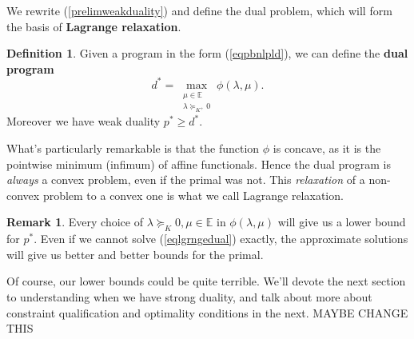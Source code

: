 \documentclass[11pt]{article}
\numberwithin{equation}{section}
\theoremstyle{definition}
\newtheorem{definition}[theorem]{Definition}%
\newtheorem{remark}[theorem]{Remark}
\newcommand{\bE}{\mathbb{E}}
\begin{document}
We rewrite (\ref{prelimweakduality}) and define the dual problem, which will form the basis of \textbf{Lagrange relaxation}.
\begin{definition}
    Given a program in the form (\ref{eqpbnlpld}), we can define the \textbf{dual program}
    \begin{equation}
        \label{eqlgrngedual}
        d^*=\max_{\substack{\mu\in\bE\\\lambda\succeq_{K^+} 0 }}\phi(\lambda,\mu).
    \end{equation}
    Moreover we have weak duality $p^*\ge d^*$.
\end{definition}
What's particularly remarkable is that the function $\phi$ is concave, as it is the pointwise minimum (infimum) of affine functionals. Hence the dual program is \textit{always} a convex problem, even if the primal was not. This \textit{relaxation} of a non-convex problem to a convex one is what we call Lagrange relaxation.
\begin{remark}
Every choice of $\lambda\succeq_K0,\mu\in\bE$ in $\phi(\lambda,\mu)$ will give us a lower bound for $p^*$. Even if we cannot solve (\ref{eqlgrngedual}) exactly, the approximate solutions will give us better and better bounds for the primal.
\end{remark}
Of course, our lower bounds could be quite terrible. We'll devote the next section to understanding when we have strong duality, and talk about more about constraint qualification and optimality conditions in the next. MAYBE CHANGE THIS
\end{document}
